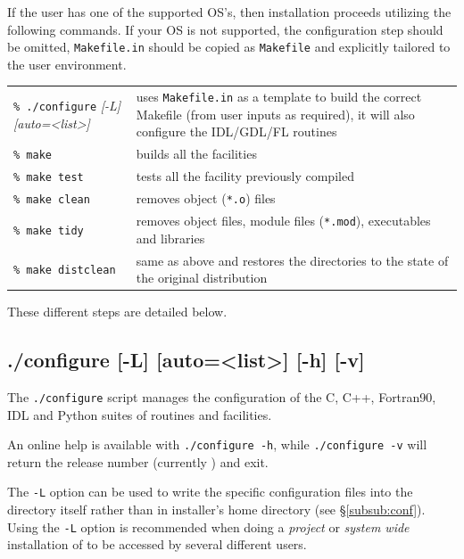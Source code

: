 \documentclass[12pt,twoside]{article}
\makeatletter
\newcommand{\doubledash}{\latexhtml{-{}-}{-{}--}}
\newcommand{\nop}[1]{\Hy@raisedlink{\hypertarget{#1}{}}}
\newcommand{\mytarget}[1]{\nop{#1}}%
\newcommand{\mytarget}[1]{\label{#1}}
\makeatother
\begin{document}
If the user has one of the supported OS's, then installation proceeds utilizing
the following commands. If your OS is not supported, the configuration step
should be omitted, \texttt{Makefile.in} should be copied as \texttt{Makefile} and explicitly
tailored to the user environment.


\begin{flushright}
\begin{tabular}{p{0.3\hsize} p{0.60\hsize}}
\texttt{\% ./configure} {\em [-L] [\doubledash auto=<list>]}    & uses \texttt{Makefile.in} as a template to build 
                         the correct Makefile (from user inputs as required), it
                         will also configure the IDL/GDL/FL routines\\
\texttt{\% make}           & builds all the facilities \\
\texttt{\% make test}      & tests all the facility previously compiled \\
\texttt{\% make clean}     & removes object (\texttt{*.o}) files \\
\texttt{\% make tidy}      & removes object files, module files (\texttt{*.mod}), executables and libraries \\
\texttt{\% make distclean} & same as above and restores the directories to the state of the 
                          original distribution \\
\end{tabular}
\end{flushright}
These different steps are detailed below.

\subsection{./configure [-L] [\doubledash auto=<list>] [-h] [-v]}
\label{sub:configure}
\mytarget{install:configure}
The \texttt{./configure} script manages the configuration of the C, C++,
Fortran90, IDL and Python suites of routines and facilities.

An online help is available with 
\texttt{./configure~-h}, while 
\texttt{./configure~-v} 
will return the \healpix release number (currently \hpxversion) and exit.

The \texttt{-L} option can be used to write the \healpix specific configuration files
into the \healpix directory itself rather than in installer's home directory (see
\S\ref{subsub:conf}).
Using the \texttt{-L} option is recommended when doing a {\em project} or {\em system wide} installation of
\healpix to be accessed by several different users.
\end{document}
